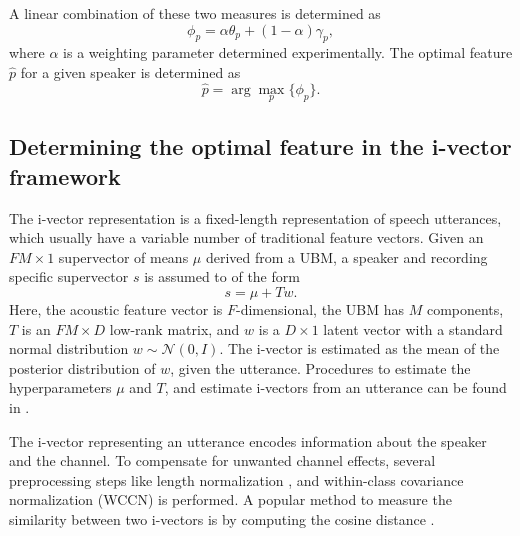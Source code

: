 \documentclass[preprint,12pt,5p]{elsarticle}
\begin{document}


A linear combination of these two measures is determined as
\begin{equation}
\phi_p = \alpha \theta_p  + (1-\alpha) \gamma_p,
\label{eq:phiFunc}
\end{equation}
where $\alpha$ is a weighting parameter determined experimentally. The optimal
feature $\hat{p}$ for a given speaker is determined as 
\begin{equation}
\hat{p} = \arg\max_p \{\phi_p\}.
\label{eq:ubm_optFeat}
\end{equation}

\subsection{Determining the optimal feature in the i-vector framework}
\label{subsec:ivec_optFeat}

The i-vector representation \cite{dehak_ivector} is a fixed-length
representation of speech utterances, which usually have a variable number of
traditional feature vectors.  Given an $FM \times 1$ supervector of means $\mu$
derived from a UBM, a speaker and recording specific supervector $s$ is assumed to of
the form
\begin{equation}
s = \mu + T w.
\end{equation}
Here, the acoustic feature vector is $F$-dimensional, the UBM has $M$ components,
$T$ is an $FM \times D$ low-rank matrix, and $w$ is a $D \times 1$ latent
vector with a standard normal distribution $w \sim \mathcal{N}(0,I)$. The
i-vector is estimated as the mean of the posterior distribution of $w$, given
the utterance. Procedures to estimate the hyperparameters $\mu$ and $T$, and 
estimate i-vectors from an utterance can be found in \cite{dehak_ivector}.

The i-vector representing an utterance encodes information about 
the speaker and the channel. To compensate for unwanted channel effects,
several preprocessing steps like length normalization \cite{garcia_lengthNorm},
and within-class covariance normalization (WCCN) \cite{wccn} is performed. A
popular method to measure the similarity between two i-vectors is by computing the
cosine distance \cite{dehak_ivector}.
\end{document}
